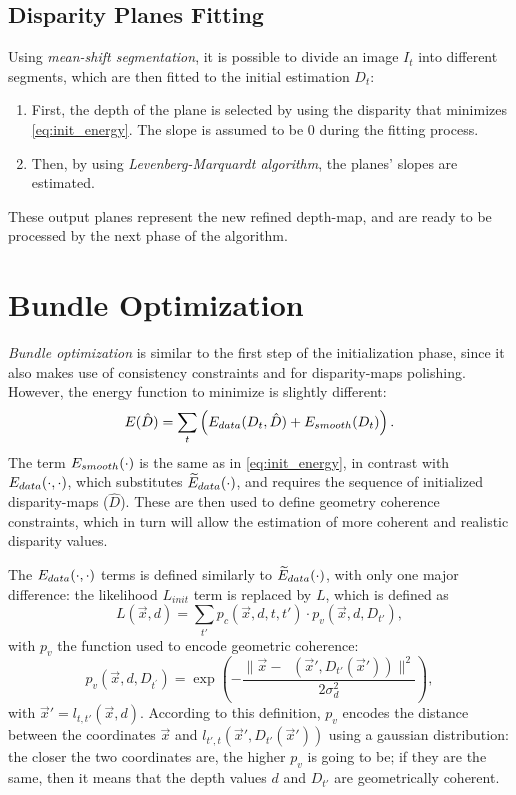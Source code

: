\subsection{Disparity Planes Fitting}\label{sec:color_segmentation}
Using \emph{mean-shift segmentation}, it is possible to divide an image $I_t$ into different segments, which are then fitted to the initial estimation $D_t$:
\begin{enumerate}
\item First, the depth of the plane is selected by using the disparity that minimizes \cref{eq:init_energy}. The slope is assumed to be 0 during the fitting process.
\item Then, by using \emph{Levenberg-Marquardt algorithm}, the planes' slopes are estimated.
\end{enumerate}
These output planes represent the new refined depth-map, and are ready to be processed by the next phase of the algorithm.%

\section{Bundle Optimization}\label{sec:bundle_phase}
\emph{Bundle optimization} is similar to the first step of the initialization phase, since it also makes use of consistency constraints and \LBP{} for disparity-maps polishing. However, the energy function to minimize is slightly different:
\begin{equation}
	E(\hat D) = \sum_{t} \left(\mathop{E_{data}}(D_t, \hat D) +
	\mathop{E_{smooth}}(D_t)\right).
\end{equation}
The term $\mathop{E_{smooth}}(\cdot)$ is the same as in \cref{eq:init_energy}, in contrast with $\mathop{E_{data}}(\cdot,\cdot)$, which substitutes $\mathop{\widetilde{E}_{data}}(\cdot)$, and requires the sequence of initialized disparity-maps ($\hat D$). These  are then used to define geometry coherence constraints, which in turn will allow the estimation of more coherent and realistic disparity values.

The $\mathop{E_{data}}(\cdot, \cdot)$ terms is defined similarly to $\mathop{\widetilde{E}_{data}}(\cdot)$, with only one major difference: the likelihood $L_{init}$ term is replaced by $L$, which is defined as
\begin{equation}\label{eq:bundle_energy_data}
L(\vec x, d) = \sum_{t'} p_c(\vec x,d,t,t')\cdot p_v(\vec x, d, D_{t'}),
\end{equation}
with $p_v$ the function used to encode geometric coherence:
\begin{equation} \label{eq:pv}
	p_v(\vec{x},d,D_{t^\prime}) = \exp \left(-\frac{\lVert \vec x - \mathop{l_{t',t}}(\vec x', D_{t'}(\vec x')) \rVert^2}{2\sigma^2_d}\right),
\end{equation}
with $\vec x'= l_{t,t'}(\vec x,d)$.
According to this definition, $p_v$ encodes the distance between the coordinates $\vec x$ and $l_{t',t}(\vec x', D_{t'}(\vec x'))$ using a gaussian distribution: the closer the two coordinates are, the higher $p_v$ is going to be; if they are the same, then it means that the depth values $d$ and $D_{t'}$ are geometrically coherent.



